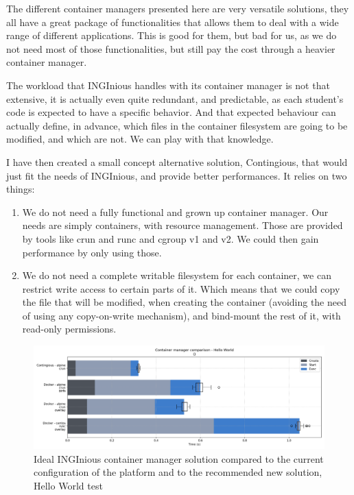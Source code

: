The different container managers presented here are very versatile solutions, they all have a great package of functionalities that allows them to deal with a wide range of different applications.  This is good for them, but bad for us, as we do not need most of those functionalities, but still pay the cost through a heavier container manager.

The workload that INGInious handles with its container manager is not that extensive, it is actually even quite redundant, and predictable, as each student's code is expected to have a specific behavior.  And that expected behaviour can actually define, in advance, which files in the container filesystem are going to be modified, and which are not.  We can play with that knowledge.

I have then created a small concept alternative solution, Contingious, that would just fit the needs of INGInious, and provide better performances.  It relies on two things:
\begin{enumerate}
  \item We do not need a fully functional and grown up container manager. Our needs are simply containers, with resource management.  Those are provided by tools like crun and runc and cgroup v1 and v2.  We could then gain performance by only using those.
  \item We do not need a complete writable filesystem for each container, we can restrict write access to certain parts of it.  Which means that we could copy the file that will be modified, when creating the container (avoiding the need of using any copy-on-write mechanism), and bind-mount the rest of it, with read-only permissions.
\end{enumerate}

\begin{figure}[h!]
  \begin{center}
    \includegraphics[width=\linewidth]{images/question-2-hello-world.png}
    \caption{Ideal INGInious container manager solution compared to the current configuration of the platform and to the recommended new solution, Hello World test}
    \label{fig:q2:hello-world}
  \end{center}
\end{figure}

